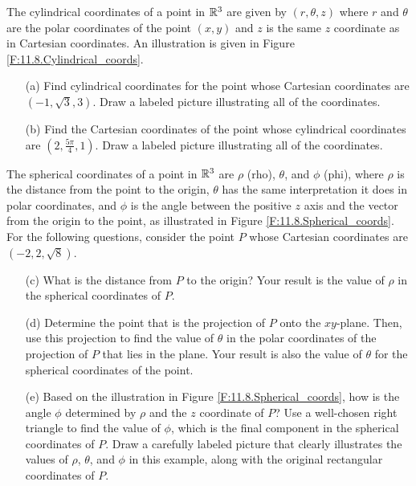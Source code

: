 \begin{pa}
\noindent The cylindrical coordinates of a point in $\mathbb{R}^3$ are given by $(r,\theta,z)$ where $r$ and $\theta$ are the polar coordinates of the point $(x, y)$ and $z$ is the same $z$ coordinate as in Cartesian coordinates. An illustration is given in Figure \ref{F:11.8.Cylindrical_coords}.
    \begin{enumerate}
    \item[(a)] Find cylindrical coordinates for the point whose Cartesian coordinates are $(-1, \sqrt{3}, 3)$. Draw a labeled picture illustrating all of the coordinates.


	\item[(b)] Find the Cartesian coordinates of the point whose cylindrical coordinates are $\left(2, \frac{5\pi}{4}, 1\right)$. Draw a labeled picture illustrating all of the coordinates.	

	\end{enumerate}

\noindent The spherical coordinates of a point in $\mathbb{R}^3$ are $\rho$ (rho), $\theta$, and $\phi$ (phi), where $\rho$ is the distance from the point to the origin, $\theta$ has the same interpretation it does in polar coordinates, and $\phi$ is the angle between the positive $z$ axis and the vector from the origin to the point, as illustrated in Figure \ref{F:11.8.Spherical_coords}.  \\

\noindent For the following questions, consider the point $P$ whose Cartesian coordinates are $(-2,2,\sqrt{8})$.

\begin{enumerate}
     \item[(c)] What is the distance from $P$ to the origin?  Your result is the value of $\rho$ in the spherical coordinates of $P$.


     \item[(d)] Determine the point that is the projection of $P$ onto the $xy$-plane.  Then, use this projection to find the value of $\theta$ in the polar coordinates of the projection of $P$ that lies in the plane.  Your result is also the value of $\theta$ for the spherical coordinates of the point.



     \item[(e)] Based on the illustration in Figure \ref{F:11.8.Spherical_coords}, how is the angle $\phi$ determined by $\rho$ and the $z$ coordinate of $P$? Use a well-chosen right triangle to find the value of $\phi$, which is the final component in the spherical coordinates of $P$. Draw a carefully labeled picture that clearly illustrates the values of $\rho$, $\theta$, and $\phi$ in this example, along with the original rectangular coordinates of $P$.



\end{enumerate}
\end{pa}
